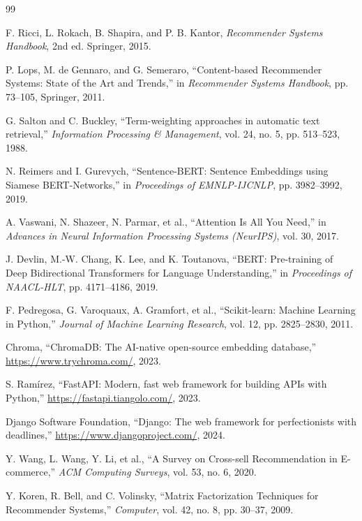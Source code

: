 \documentclass[12pt,a4paper]{report}
\begin{document}
\begin{thebibliography}{99}

F. Ricci, L. Rokach, B. Shapira, and P. B. Kantor,
\textit{Recommender Systems Handbook}, 2nd ed.
Springer, 2015.

P. Lops, M. de Gennaro, and G. Semeraro,
``Content-based Recommender Systems: State of the Art and Trends,''
in \textit{Recommender Systems Handbook}, pp. 73--105, Springer, 2011.

G. Salton and C. Buckley,
``Term-weighting approaches in automatic text retrieval,''
\textit{Information Processing \& Management}, vol. 24, no. 5, pp. 513--523, 1988.

N. Reimers and I. Gurevych,
``Sentence-BERT: Sentence Embeddings using Siamese BERT-Networks,''
in \textit{Proceedings of EMNLP-IJCNLP}, pp. 3982--3992, 2019.

A. Vaswani, N. Shazeer, N. Parmar, et al.,
``Attention Is All You Need,''
in \textit{Advances in Neural Information Processing Systems (NeurIPS)}, vol. 30, 2017.

J. Devlin, M.-W. Chang, K. Lee, and K. Toutanova,
``BERT: Pre-training of Deep Bidirectional Transformers for Language Understanding,''
in \textit{Proceedings of NAACL-HLT}, pp. 4171--4186, 2019.

F. Pedregosa, G. Varoquaux, A. Gramfort, et al.,
``Scikit-learn: Machine Learning in Python,''
\textit{Journal of Machine Learning Research}, vol. 12, pp. 2825--2830, 2011.

Chroma,
``ChromaDB: The AI-native open-source embedding database,''
\url{https://www.trychroma.com/}, 2023.

S. Ramírez,
``FastAPI: Modern, fast web framework for building APIs with Python,''
\url{https://fastapi.tiangolo.com/}, 2023.

Django Software Foundation,
``Django: The web framework for perfectionists with deadlines,''
\url{https://www.djangoproject.com/}, 2024.

Y. Wang, L. Wang, Y. Li, et al.,
``A Survey on Cross-sell Recommendation in E-commerce,''
\textit{ACM Computing Surveys}, vol. 53, no. 6, 2020.

Y. Koren, R. Bell, and C. Volinsky,
``Matrix Factorization Techniques for Recommender Systems,''
\textit{Computer}, vol. 42, no. 8, pp. 30--37, 2009.

\end{thebibliography}
\end{document}
